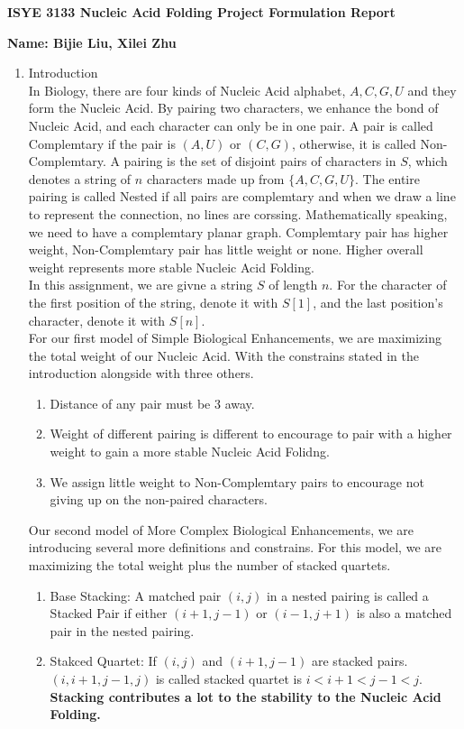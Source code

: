 \documentclass[11pt]{article}
\begin{document}
{\noindent\Large\textbf{ISYE 3133 Nucleic Acid Folding Project Formulation Report}}

\vspace{.25in}

{\large
\noindent
\textbf{Name: Bijie Liu, Xilei Zhu} \smallskip \\




\begin{enumerate}
\item  Introduction\\
In Biology, there are four kinds of Nucleic Acid alphabet, $A,C,G,U$ and they form the Nucleic Acid. By pairing two characters, we enhance the bond of Nucleic Acid, and each character can only be in one pair. A pair is called Complemtary if the pair is $(A,U)$ or $(C,G)$, otherwise, it is called Non-Complemtary. A pairing is the set of disjoint pairs of characters in $S$, which denotes a string of $n$ characters made up from $\{A,C,G,U\}$. The entire pairing is called Nested if all pairs are complemtary and when we draw a line to represent the connection, no lines are corssing. Mathematically speaking, we need to have a complemtary planar graph. Complemtary pair has higher weight, Non-Complemtary pair has little weight or none. Higher overall weight represents more stable Nucleic Acid Folding.\\

In this assignment, we are givne a string $S$ of length $n$. For the character of the first position of the string, denote it with $S[1]$, and the last position's character, denote it with $S[n]$.\\
For our first model of Simple Biological Enhancements, we are maximizing the total weight of our Nucleic Acid. With the constrains stated in the introduction alongside with three others. 
\begin{enumerate}
    \item Distance of any pair must be 3 away.
    \item Weight of different pairing is different to encourage to pair with a higher weight to gain a more stable Nucleic Acid Folidng.
    \item We assign little weight to Non-Complemtary pairs to encourage not giving up on the non-paired characters.
\end{enumerate}


Our second model of More Complex Biological Enhancements, we are introducing several more definitions and constrains. For this model, we are maximizing the total weight plus the number of stacked quartets.
\begin{enumerate}
    \item Base Stacking: A matched pair $(i,j)$ in a nested pairing is called a Stacked Pair if either $(i+1,j-1)$ or $(i-1,j+1)$ is also a matched pair in the nested pairing.
    \item Stakced Quartet: If $(i,j)$ and $(i+1,j-1)$ are stacked pairs. $(i,i+1,j-1,j)$ is called stacked quartet is $i<i+1<j-1<j$.\\
    \textbf{Stacking contributes a lot to the stability to the Nucleic Acid Folding.}


\end{enumerate}
\end{enumerate}}
\end{document}

